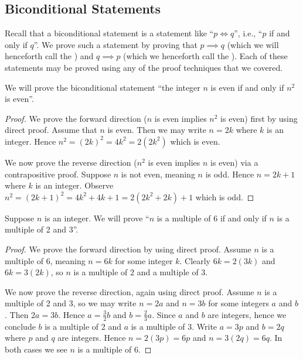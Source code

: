 \subsection{Biconditional Statements}
Recall that a biconditional statement is a statement like ``$p \iff q$'', i.e., ``$p$ if and only if $q$''. We prove such a statement by proving that $p \implies q$ (which we will henceforth call the ) and $q \implies p$ (which we henceforth call the ). Each of these statements may be proved using any of the proof techniques that we covered.

\begin{example}
    \setlength{\parindent}{1.5em}

    We will prove the biconditional statement ``the integer $n$ is even if and only if $n^2$ is even''.
    \begin{proof}
        We prove the forward direction ($n$ is even implies $n^2$ is even) first by using direct proof. Assume that $n$ is even. Then we may write $n = 2k$ where $k$ is an integer. Hence $n^2 = (2k)^2 = 4k^2 = 2(2k^2)$ which is even.

        We now prove the reverse direction ($n^2$ is even implies $n$ is even) via a contrapositive proof. Suppose $n$ is not even, meaning $n$ is odd. Hence $n = 2k + 1$ where $k$ is an integer. Observe $n^2 = (2k+1)^2 = 4k^2 + 4k + 1 = 2(2k^2 + 2k) + 1$ which is odd.
    \end{proof}
\end{example}

\begin{example}
    \setlength{\parindent}{1.5em}

    Suppose $n$ is an integer. We will prove ``$n$ is a multiple of 6 if and only if $n$ is a multiple of 2 and 3''.
    \begin{proof}
        We prove the forward direction by using direct proof. Assume $n$ is a multiple of 6, meaning $n = 6k$ for some integer $k$. Clearly $6k = 2(3k)$ and $6k = 3(2k)$, so $n$ is a multiple of 2 and a multiple of 3.

        We now prove the reverse direction, again using direct proof. Assume $n$ is a multiple of 2 and 3, so we may write $n = 2a$ and $n = 3b$ for some integers $a$ and $b$. Then $2a = 3b$. Hence $a = \frac 32 b$ and $b = \frac 23 a$. Since $a$ and $b$ are integers, hence we conclude $b$ is a multiple of 2 and $a$ is a multiple of 3. Write $a = 3p$ and $b = 2q$ where $p$ and $q$ are integers. Hence $n = 2(3p) = 6p$ and $n = 3(2q) = 6q$. In both cases we see $n$ is a multiple of 6.
    \end{proof}
\end{example}

